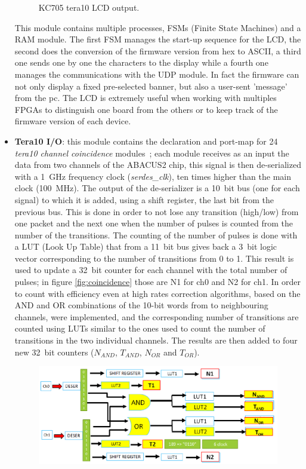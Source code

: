 \begin{itemize}
\begin{figure}[H]
		\caption{KC705 tera10 LCD output.}
		\label{fig:lcd}
	\end{figure}
	\noindent This module contains multiple processes, FSMs (Finite State Machines) and a RAM module. The first FSM manages the start-up sequence for the LCD, the second does the conversion of the firmware version from hex to ASCII, a third one sends one by one the characters to the display while a fourth one manages the communications with the UDP module. In fact the firmware can not only display a fixed pre-selected banner, but also a user-sent 'message' from the pc.
	The LCD is extremely useful when working with multiples FPGAs to distinguish one board from the others or to keep track of the firmware version of each device.
	\item \textbf{Tera10 I/O}: this module contains the declaration and port-map for 24 \textit{tera10 channel coincidence} modules~\cite{limardi}; each module receives as an input the data from two channels of the ABACUS2 chip, this signal is then de-serialized with a 1~GHz frequency clock (\textit{serdes\_clk}), ten times higher than the main clock (100~MHz). The output of the de-serializer is a 10~bit bus (one for each signal) to which it is added, using a shift register, the last bit from the previous bus. This is done in order to not lose any transition (high/low) from one packet and the next one when the number of pulses is counted from the number of the transitions.
	\newline
	The counting of the number of pulses is done with a LUT (Look Up Table) that from a 11~bit bus gives back a 3~bit logic vector corresponding to the number of transitions from 0 to 1. This result is used to update a 32~bit counter for each channel with the total number of pulses; in figure \ref{fig:coincidence} those are N1 for ch0 and N2 for ch1.
	\newline
	In order to count with efficiency even at high rates correction algorithms, based on the AND and OR combinations of the 10-bit words from to neighbouring channels, were implemented, and the corresponding number of transitions are counted using LUTs similar to the ones used to count the number of transitions in the two individual channels. The results are then added to four new 32~bit counters ($N_{AND}$, $T_{AND}$, $N_{OR}$ and $T_{OR}$). 
	\begin{figure}[H]
		\centering
		\includegraphics[width=0.7\linewidth]{IMG/ch4/COINCIDENCE}

\end{figure}
\end{itemize}
